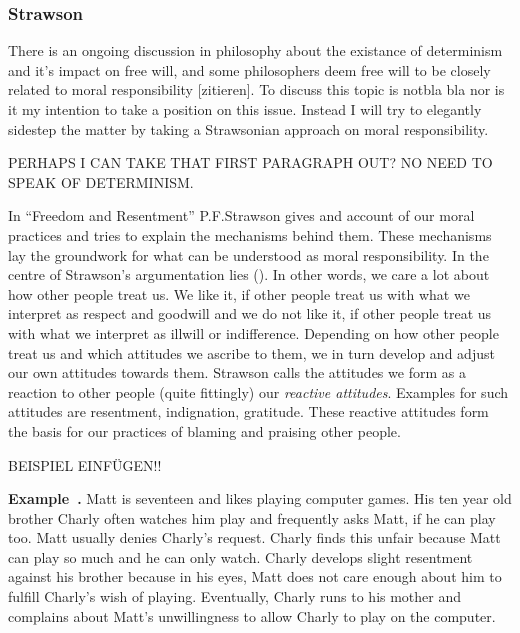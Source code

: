 \documentclass{article}
\newcounter{example}[section]
\newenvironment{example}[1][]{\refstepcounter{example}\par\medskip
   \noindent \textbf{Example~\theexample. #1} \rmfamily}{\medskip}
\begin{document}
\subsubsection{Strawson}

There is an ongoing discussion in philosophy about the existance of determinism
and it's impact on free will, and some philosophers deem free will to be closely related to
moral responsibility [zitieren]. To discuss this topic is notbla bla nor is it
my intention to take a position on this issue. Instead I will try to elegantly
sidestep the matter by taking a Strawsonian approach on moral responsibility.

PERHAPS I CAN TAKE THAT FIRST PARAGRAPH OUT? NO NEED TO SPEAK OF DETERMINISM.

In ``Freedom and Resentment'' P.F.Strawson gives and account of our moral
practices and tries to explain the mechanisms behind them. These mechanisms lay
the groundwork for what can be understood as moral responsibility.
In the centre of Strawson's argumentation lies (\cite[p.5]{Strawson1962}). In other words, we care a lot about how other
people treat us. We like it, if other people treat us with what we interpret as
respect and goodwill and we do not like it, if other people treat us with what
we interpret as illwill or indifference. Depending on how other people treat us
and which attitudes we ascribe to them, we in turn develop and adjust our own
attitudes towards them. Strawson calls the attitudes we form as a reaction to
other people (quite fittingly) our \textit{reactive
attitudes}. Examples for such attitudes are resentment, indignation, gratitude.
These reactive attitudes form the basis for our practices of blaming and
praising other people.

BEISPIEL EINFÜGEN!!


\begin{example}
	Matt is seventeen and likes playing computer games. His ten year old brother
	Charly often watches him play and frequently asks Matt, if he can play
	too. Matt usually denies Charly's request. Charly finds this unfair
	because Matt can play so much and he can only watch. Charly develops
	slight resentment against his brother because in his eyes, Matt
	does not care enough about him to fulfill Charly's wish of playing.
	Eventually, Charly runs to his mother and complains about Matt's
	unwillingness to allow Charly to play on the computer.
\end{example}
\end{document}
